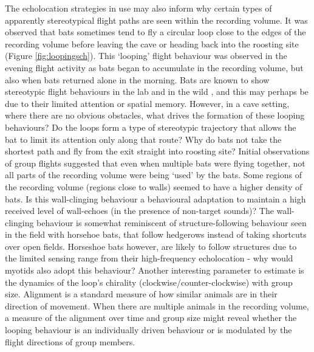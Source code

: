 \documentclass[
]{book}
\begin{document}
The echolocation strategies in use may also inform why certain types of apparently stereotypical flight paths are seen within the recording volume. It was observed that bats sometimes tend to fly a circular loop close to the edges of the recording volume before leaving the cave or heading back into the roosting site (Figure \ref{fig:loopingsch}). This `looping' flight behaviour was observed in the evening flight activity as bats began to accumulate in the recording volume, but also when bats returned alone in the morning. Bats are known to show stereotypic flight behaviours in the lab and in the wild \citep{barchi2013spatial, mohres1949versuche}, and this may perhaps be due to their limited attention or spatial memory. However, in a cave setting, where there are no obvious obstacles, what drives the formation of these looping behaviours? Do the loops form a type of stereotypic trajectory that allows the bat to limit its attention only along that route? Why do bats not take the shortest path and fly from the exit straight into roosting site? Initial observations of group flights suggested that even when multiple bats were flying together, not all parts of the recording volume were being `used' by the bats. Some regions of the recording volume (regions close to walls) seemed to have a higher density of bats. Is this wall-clinging behaviour a behavioural adaptation to maintain a high received level of wall-echoes (in the presence of non-target sounds)? The wall-clinging behaviour is somewhat reminiscent of structure-following behaviour seen in the field with horsehoe bats, that follow hedgerows instead of taking shortcuts over open fields. Horseshoe bats however, are likely to follow structures due to the limited sensing range from their high-frequency echolocation - why would myotids also adopt this behaviour? Another interesting parameter to estimate is the dynamics of the loop's chirality (clockwise/counter-clockwise) with group size. Alignment is a standard measure of how similar animals are in their direction of movement. When there are multiple animals in the recording volume, a measure of the alignment over time and group size might reveal whether the looping behaviour is an individually driven behaviour or is modulated by the flight directions of group members.
\end{document}
